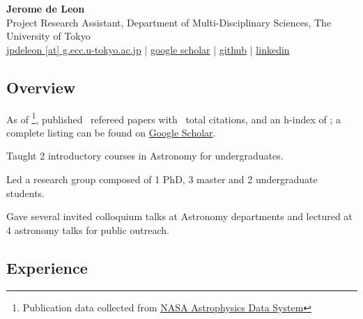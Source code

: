 \documentclass[11pt,letterpaper]{article}
\begin{document}
\thispagestyle{empty}\sloppy\sloppypar\raggedbottom

\textbf{\Large Jerome de Leon} \\[0.5ex]
Project Research Assistant, Department of Multi-Disciplinary Sciences, The University of Tokyo \\
\textsf{\small 
    \href{mailto:jpdeleon@g.ecc.u-tokyo.ac.jp}{jpdeleon [at] g.ecc.u-tokyo.ac.jp} | %
    \href{https://scholar.google.com/citations?hl=en&user=_Z8ialwAAAAJ&view_op=list_works&sortby=pubdate}{google scholar} | %
    \href{https://github.com/jpdeleon}{github} | %
    \href{https://www.linkedin.com/in/jpdeleonbsap/}{linkedin} %
}\\[0.5ex]

\subsection{Overview}
\begin{list}{}{\cvlist}
\item \item As of \pubsdate\footnote{Publication data collected from \href{https://ui.adsabs.harvard.edu/}{NASA Astrophysics Data System}}, published \pubsnumber\ refereed papers with \pubscitations\ total citations, and an h-index of \pubshindex; a complete listing can be found on \href{https://scholar.google.co.jp/citations?hl=en&user=_Z8ialwAAAAJ}{Google Scholar}.
\item Taught 2 introductory courses in Astronomy for undergraduates. 
\item Led a research group composed of 1 PhD, 3 master and 2 undergraduate students. 
\item Gave several invited colloquium talks at Astronomy departments and lectured at 4 astronomy talks for public outreach.
\end{list}

\subsection{Experience}
\end{document}
